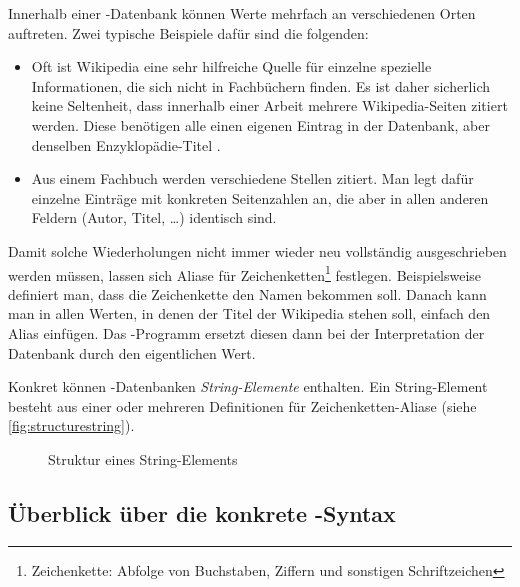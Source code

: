 Innerhalb einer \mbox{\BibTeX-}Datenbank können Werte mehrfach an verschiedenen
Orten auftreten. Zwei typische Beispiele dafür sind die folgenden:
\begin{itemize}
    \item Oft ist Wikipedia eine sehr hilfreiche Quelle für einzelne spezielle
        Informationen, die sich nicht in Fachbüchern finden. Es ist daher
        sicherlich keine Seltenheit, dass innerhalb einer Arbeit mehrere
        Wikipedia-Seiten zitiert werden. Diese benötigen alle einen eigenen
        Eintrag in der Datenbank, aber denselben Enzyklopädie-Titel \temp.
    \item Aus einem Fachbuch werden verschiedene Stellen zitiert. Man legt dafür
        einzelne Einträge mit konkreten Seitenzahlen an, die aber in allen
        anderen Feldern (Autor, Titel, \dots) identisch sind.
\end{itemize}
Damit solche Wiederholungen nicht immer wieder neu vollständig ausgeschrieben
werden müssen, lassen sich Aliase für Zeichenketten\footnote{
    {\titlelike Zeichenkette:} Abfolge von Buchstaben, Ziffern und sonstigen Schriftzeichen
} festlegen. Beispielsweise definiert man, dass die Zeichenkette \temp{} den
Namen  bekommen soll. Danach kann man in allen Werten, in denen der Titel der Wikipedia stehen soll, einfach den Alias 
einfügen. Das \mbox{\BibTeX-}Programm ersetzt diesen dann bei der Interpretation
der Datenbank durch den eigentlichen Wert.

Konkret können \mbox{\BibTeX-}Datenbanken \emph{String-Elemente} enthalten. Ein
String-Element besteht aus einer oder mehreren Definitionen für Zeichenketten-Aliase (siehe \autoref{fig:structurestring}).

\begin{figure}
    \centering
    \caption{Struktur eines String-Elements}
    \label{fig:structurestring}
\end{figure}

\subsection{Überblick über die konkrete \mbox{\BibTeX-}Syntax}